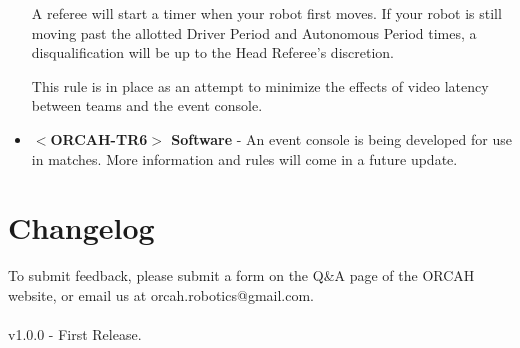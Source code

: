 \documentclass[letterpaper, 12pt]{article}
\begin{document}
\begin{itemize}[label={}]
A referee will start a timer when your robot first moves.  If your robot is still moving past the allotted Driver Period and Autonomous Period times, a disqualification will be up to the Head Referee’s discretion. 

This rule is in place as an attempt to minimize the effects of video latency between teams and the event console.

\item\textbf{$<$ORCAH-TR6$>$ Software} - An event console is being developed for use in matches. More information and rules will come in a future update.

\end{itemize}

\section*{Changelog}
To submit feedback, please submit a form on the Q\&A page of the ORCAH website, or email us at orcah.robotics@gmail.com.
\\~\\
v1.0.0 - First Release.
\end{document}
